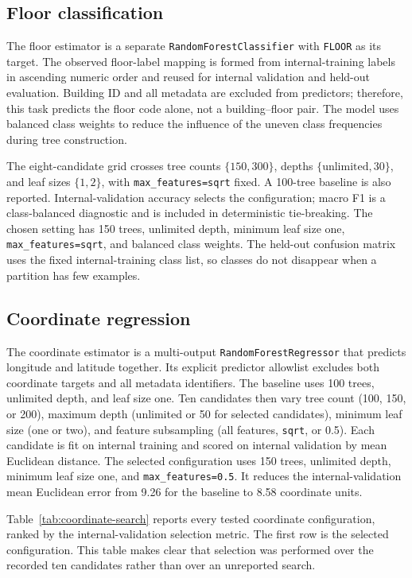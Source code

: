 \documentclass[conference]{IEEEtran}
\begin{document}
\subsection{Floor classification}
The floor estimator is a separate \texttt{RandomForestClassifier} with \texttt{FLOOR} as its target. The observed floor-label mapping is formed from internal-training labels in ascending numeric order and reused for internal validation and held-out evaluation. Building ID and all metadata are excluded from predictors; therefore, this task predicts the floor code alone, not a building--floor pair. The model uses balanced class weights to reduce the influence of the uneven class frequencies during tree construction.

The eight-candidate grid crosses tree counts \(\{150,300\}\), depths \(\{\text{unlimited},30\}\), and leaf sizes \(\{1,2\}\), with \texttt{max\_features=sqrt} fixed. A 100-tree baseline is also reported. Internal-validation accuracy selects the configuration; macro F1 is a class-balanced diagnostic and is included in deterministic tie-breaking. The chosen setting has 150 trees, unlimited depth, minimum leaf size one, \texttt{max\_features=sqrt}, and balanced class weights. The held-out confusion matrix uses the fixed internal-training class list, so classes do not disappear when a partition has few examples.

\subsection{Coordinate regression}
The coordinate estimator is a multi-output \texttt{RandomForestRegressor} that predicts longitude and latitude together. Its explicit predictor allowlist excludes both coordinate targets and all metadata identifiers. The baseline uses 100 trees, unlimited depth, and leaf size one. Ten candidates then vary tree count (100, 150, or 200), maximum depth (unlimited or 50 for selected candidates), minimum leaf size (one or two), and feature subsampling (all features, \texttt{sqrt}, or 0.5). Each candidate is fit on internal training and scored on internal validation by mean Euclidean distance. The selected configuration uses 150 trees, unlimited depth, minimum leaf size one, and \texttt{max\_features=0.5}. It reduces the internal-validation mean Euclidean error from 9.26 for the baseline to 8.58 coordinate units.

Table~\ref{tab:coordinate-search} reports every tested coordinate configuration, ranked by the internal-validation selection metric. The first row is the selected configuration. This table makes clear that selection was performed over the recorded ten candidates rather than over an unreported search.
\end{document}
